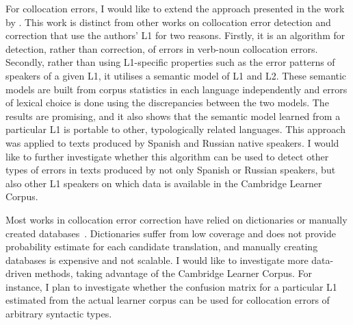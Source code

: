 \documentclass[11pt]{article}
\begin{document}
For collocation errors, I would like to extend the approach presented in the work by \cite{kochmarcross}.  This work is distinct from other works on collocation error detection and correction that use the authors’ L1 for two reasons. Firstly, it is an algorithm for detection, rather than correction, of errors in verb-noun collocation errors. Secondly, rather than using L1-specific properties such as the error patterns of speakers of a given L1, it utilises a semantic model of L1 and L2. These semantic models are built from corpus statistics in each language independently and errors of lexical choice is done using the discrepancies between the two models. The results are promising, and it also shows that the semantic model learned from a particular L1 is portable to other, typologically related languages. This approach was applied to texts produced by Spanish and Russian native speakers. I would like to further investigate whether this algorithm can be used to detect other types of errors in texts produced by not only Spanish or Russian speakers, but also other L1 speakers on which data is available in the Cambridge Learner Corpus.
					
Most works in collocation error correction have relied on dictionaries or manually created databases~\citep{shei2000esl, wible2003bootstrapping, futagi2008computational}. Dictionaries suffer from low coverage and does not provide probability estimate for each candidate translation, and manually creating databases is expensive and not scalable. I would like to investigate more data-driven methods, taking advantage of the Cambridge Learner Corpus. For instance, I plan to investigate whether the confusion matrix for a particular L1 estimated from the actual learner corpus can be used for collocation errors of arbitrary syntactic types.
\end{document}
